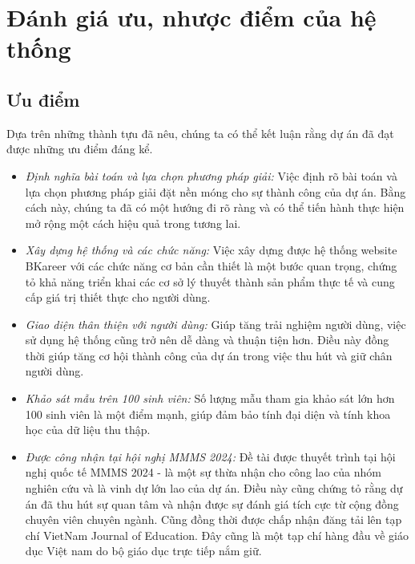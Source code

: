 \section{Đánh giá ưu, nhược điểm của hệ thống}
    \subsection{Ưu điểm}
        Dựa trên những thành tựu đã nêu, chúng ta có thể kết luận rằng dự án đã đạt được những ưu điểm đáng kể.
        
        \begin{itemize}
            \item \textit{Định nghĩa bài toán và lựa chọn phương pháp giải:} Việc định rõ bài toán và lựa chọn phương pháp giải đặt nền móng cho sự thành công của dự án. Bằng cách này, chúng ta đã có một hướng đi rõ ràng và có thể tiến hành thực hiện mở rộng một cách hiệu quả trong tương lai.
            \item \textit{Xây dựng hệ thống và các chức năng:} Việc xây dựng được hệ thống website BKareer với các chức năng cơ bản cần thiết là một bước quan trọng, chứng tỏ khả năng triển khai các cơ sở lý thuyết thành sản phẩm thực tế và cung cấp giá trị thiết thực cho người dùng.
            \item \textit{Giao diện thân thiện với người dùng:} Giúp tăng trải nghiệm người dùng, việc sử dụng hệ thống cũng trở nên dễ dàng và thuận tiện hơn. Điều này đồng thời giúp tăng cơ hội thành công của dự án trong việc thu hút và giữ chân người dùng.
            \item \textit{Khảo sát mẫu trên 100 sinh viên:} Số lượng mẫu tham gia khảo sát lớn hơn 100 sinh viên là một điểm mạnh, giúp đảm bảo tính đại diện và tính khoa học của dữ liệu thu thập.
            \item \textit{Được công nhận tại hội nghị MMMS 2024:} Đề tài được thuyết trình tại hội nghị quốc tế MMMS 2024 - là một sự thừa nhận cho công lao của nhóm nghiên cứu và là vinh dự lớn lao của dự án. Điều này cũng chứng tỏ rằng dự án đã thu hút sự quan tâm và nhận được sự đánh giá tích cực từ cộng đồng chuyên viên chuyên ngành. Cũng đồng thời được chấp nhận đăng tải lên tạp chí VietNam Journal of Education. Đây cũng là một tạp chí hàng đầu về giáo dục Việt nam do bộ giáo dục trực tiếp nắm giữ.
        \end{itemize}
